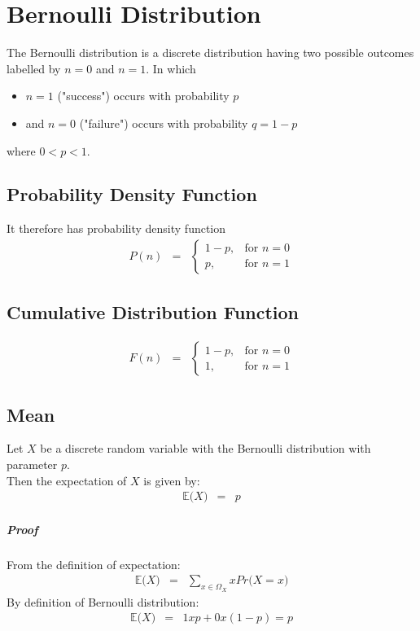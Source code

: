 \chapter{Bernoulli Distribution}
The Bernoulli distribution is a discrete distribution having two possible outcomes labelled by $n = 0$ and $n = 1$. In which
\begin{itemize}
	\item $n = 1$ ("success") occurs with probability $p$
	\item and $n = 0$ ("failure") occurs with probability $q = 1 - p$
\end{itemize}
where $0 < p < 1$.

\section{Probability Density Function}
It therefore has probability density function
\begin{eqnarray}
	P(n) &=& \begin{cases}
		1 - p, & \text{for $n = 0$}\\
		p, & \text{for $n = 1$}
	\end{cases}
\end{eqnarray}

\section{Cumulative Distribution Function}
\begin{eqnarray}
 F(n) &=& \begin{cases}
 	1 - p, &\text{for $n = 0$}\\
 	1, & \text{for $n = 1$}
 \end{cases}
\end{eqnarray}

\section{Mean}
Let $X$ be a discrete random variable with the Bernoulli distribution with parameter $p$.\\
Then the expectation of $X$ is given by:
\begin{eqnarray}
	\mathbb{E}\big(X\big) &=& p
\end{eqnarray}

\paragraph{Proof}
From the definition of expectation:
\begin{eqnarray}
	\mathbb{E}\big(X\big) &=& \sum_{x\in\Omega_{X}}x Pr\big(X = x\big)
\end{eqnarray}
By definition of Bernoulli  distribution:
\begin{eqnarray}
	\mathbb{E}\big(X\big) &=& 1 x p + 0 x (1 - p) = p
\end{eqnarray}

